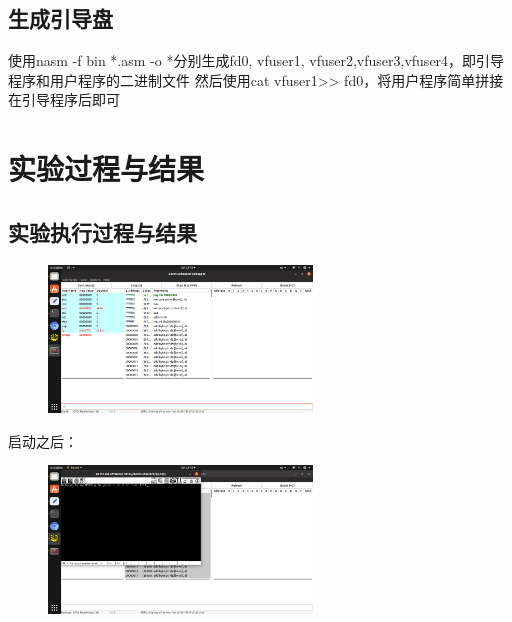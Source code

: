 \documentclass[a4paper,11pt,UTF8]{ctexart}
\begin{document}
\subsection{生成引导盘}
使用nasm -f bin *.asm -o *分别生成fd0, vfuser1, vfuser2,vfuser3,vfuser4，即引导程序和用户程序的二进制文件
然后使用cat vfuser1>> fd0，将用户程序简单拼接在引导程序后即可


\section{实验过程与结果}
\subsection{实验执行过程与结果}

\begin{figure}[htbp]
	\centering
\end{figure}
	\begin{figure}[htbp]{
		\centering
		\includegraphics[width=7cm]{Screenshot from 2019-03-23 22-43-02.png}
	}
\end{figure}

启动之后：

\begin{figure}[htbp]{
	\centering
		\includegraphics[width=7cm]{Screenshot from 2019-03-23 22-43-10.png}
	\quad
}
\end{figure}
\end{document}
